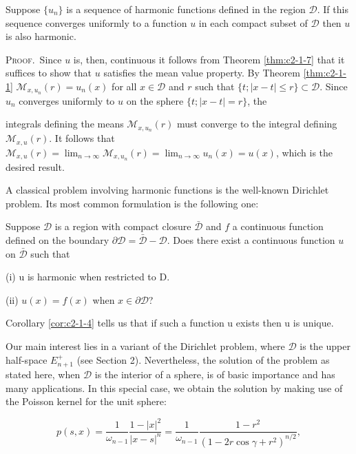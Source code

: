 \begin{corollary}
\label{cor:c2-1-8}
Suppose $\{u_n\}$ is a sequence of harmonic functions defined in the region $\mathcal{D}$. If this sequence converges uniformly to a function $u$ in each compact subset of $\mathcal{D}$ then $u$ is also harmonic.
\end{corollary}

\textsc{Proof.}\ Since $u$ is, then, continuous it follows from Theorem \ref{thm:c2-1-7} that it suffices to show that $u$ satisfies the mean value property. By Theorem \ref{thm:c2-1-1} $\mathcal{M}_{x,u_n}(r) = u_n(x)$ for all $x \in \mathcal{D}$ and $r$ such that $\{t; |x - t| \leq r\} \subset \mathcal{D}$. Since $u_n$ converges uniformly to $u$ on the sphere $\{t; |x - t| = r\}$, the

integrals defining the means $\mathcal{M}_{x,u_n}(r)$ must converge to the integral defining $\mathcal{M}_{x,u}(r)$. It follows that $\mathcal{M}_{x,u}(r) = \lim_{n \to \infty} \mathcal{M}_{x,u_n}(r) = \lim_{n \to \infty} u_n(x) = u(x)$, which is the desired result.

A classical problem involving harmonic functions is the well-known Dirichlet problem. Its most common formulation is the following one:

Suppose $\mathcal{D}$ is a region with compact closure $\bar{\mathcal{D}}$ and $f$ a continuous function defined on the boundary $\partial\mathcal{D} = \bar{\mathcal{D}} - \mathcal{D}$. Does there exist a continuous function $u$ on $\bar{\mathcal{D}}$ such that

(i) u is harmonic when restricted to D.

(ii) $u(x) = f(x)$ when $x \in \partial \mathcal{D}$?

Corollary \ref{cor:c2-1-4} tells us that if such a function u exists then u is unique.

Our main interest lies in a variant of the Dirichlet problem, where $\mathcal{D}$ is the upper half-space $E_{n+1}^{+}$ (see Section 2). Nevertheless, the solution of the problem as stated here, when $\mathcal{D}$ is the interior of a sphere, is of basic importance and has many applications. In this special case, we obtain the solution by making use of the Poisson kernel for the unit sphere:

\[
p(s,x)=\frac{1}{\omega_{n-1}}\frac{1-|x|^{2}}{|x-s|^{n}}=\frac{1}{\omega_{n-1}}\frac{1-r^{2}}{(1-2r\cos\gamma+r^{2})^{n/2}},
\]

